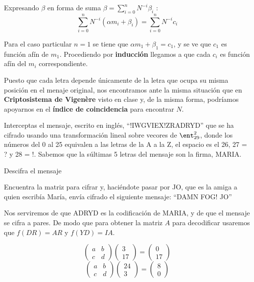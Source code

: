 \begin{problem}[2]
Expresando $β$ en forma de suma $β = \sum_{i=0}^n N^{-i}β_i$ :
\[\sum_{i=0}^n N^{-i}(α m_i + β_i) = \sum_{i=0}^n N^{-i}c_i\]

Para el caso particular $n=1$ se tiene que $αm_1 + β_1 = c_1$, y se ve que $c_1$ es función afín de $m_1$. Procediendo por \textbf{inducción} llegamos a que cada $c_i$ es función afín del $m_i$ correspondiente.


\spart
Puesto que cada letra depende únicamente de la letra que ocupa su misma posición en el menaje original, nos encontramos ante la misma situación que en \textbf{Criptosistema de Vigenère} visto en clase y, de la misma forma, podríamos apoyarnos en el \textbf{índice de coincidencia} para encontrar $N$.
\end{problem}

\begin{problem}[3]
Interceptas el mensaje, escrito en inglés, ``!IWGVIEX!ZRADRYD'' que se ha cifrado usando una transformación lineal sobre vecores de $\ent_{29}^2$, donde los números del 0 al 25 equivalen a las letras de la A a la Z, el espacio es el 26, 27 = ? y 28 = !. Sabemos que la súltimas 5 letras del mensaje son la firma, MARIA.

\ppart Descifra el mensaje

\ppart Encuentra la matriz para cifrar y, haciéndote pasar por JO, que es la amiga a quien escribía María, envía cifrado el siguiente mensaje: ``DAMN FOG! JO''


\solution
{}

\spart
Nos serviremos de que ADRYD es la codificación de MARIA, y de que el mensaje se cifra a pares. De modo que para obtener la matriz $A$ para decodificar usaremos que $f(DR)=AR$ y $f(YD)=IA$.

\[ \left( \begin{array}{cc}
	a & b \\
	c & d
	\end{array} \right)
	\left( \begin{array}{cc}
	3 \\
	17
	\end{array} \right)
	=
	\left( \begin{array}{cc}
	0 \\
	17
	\end{array} \right)
\]
\[
	\left( \begin{array}{cc}
	a & b \\
	c & d
	\end{array} \right)
	\left( \begin{array}{cc}
	24 \\
	3
	\end{array} \right)
	=
	\left( \begin{array}{cc}
	8 \\
	0
	\end{array} \right)
\]


\end{problem}
